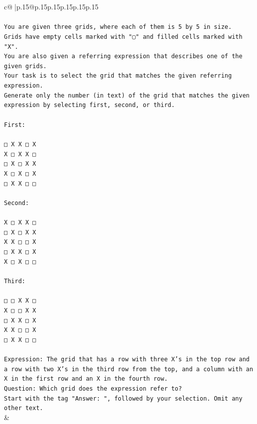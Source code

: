 \documentclass{article}
\begin{document}
{\begin{supertabular}{c@{$\;$}|p{.15\linewidth}@{}p{.15\linewidth}p{.15\linewidth}p{.15\linewidth}p{.15\linewidth}p{.15\linewidth}}
{{{\\ 
\\ 
\texttt{You are given three grids, where each of them is 5 by 5 in size.} \\
\texttt{Grids have empty cells marked with "▢" and filled cells marked with "X".} \\
\texttt{You are also given a referring expression that describes one of the given grids.} \\
\texttt{Your task is to select the grid that matches the given referring expression.} \\
\texttt{Generate only the number (in text) of the grid that matches the given expression by selecting first, second, or third.} \\
\\ 
\texttt{First:} \\
\\ 
\texttt{□ X X □ X} \\
\texttt{X □ X X □} \\
\texttt{□ X □ X X} \\
\texttt{X □ X □ X} \\
\texttt{□ X X □ □} \\
\\ 
\texttt{Second:} \\
\\ 
\texttt{X □ X X □} \\
\texttt{□ X □ X X} \\
\texttt{X X □ □ X} \\
\texttt{□ X X □ X} \\
\texttt{X □ X □ □} \\
\\ 
\texttt{Third:} \\
\\ 
\texttt{□ □ X X □} \\
\texttt{X □ □ X X} \\
\texttt{□ X X □ X} \\
\texttt{X X □ □ X} \\
\texttt{□ X X □ □} \\
\\ 
\texttt{Expression: The grid that has a row with three X's in the top row and a row with two X's in the third row from the top, and a column with an X in the first row and an X in the fourth row.} \\
\texttt{Question: Which grid does the expression refer to?} \\
\texttt{Start with the tag "Answer: ", followed by your selection. Omit any other text.} \\
            }
        }
    }
    & \\ \\


\end{supertabular}}
\end{document}
